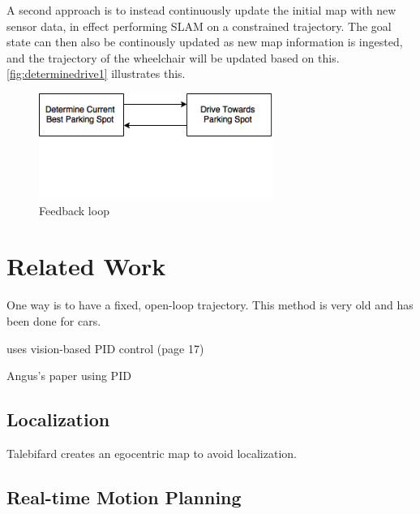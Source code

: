 A second approach is to instead continuously update the initial map with new
sensor data, in effect performing SLAM on a constrained trajectory. The goal
state can then also be continously updated as new map information is ingested,
and the trajectory of the wheelchair will be updated based on this.
\autoref{fig:determinedrive1} illustrates this.
 
\begin{figure} %
\centering
\includegraphics[width=3in]{figures/determinedrive1.png}
\caption{Feedback loop}
\label{fig:determinedrive1}
\end{figure}   %

\section{Related Work}
\label{sec:backinginlitreview}
One way is to have a fixed, open-loop trajectory. This method is very old and
has been done for cars.

\cite{sermeno2006vision} uses vision-based PID control (page 17)

Angus's paper using PID

\subsection{Localization}
Talebifard \cite{talebifard2014risk} creates an egocentric map to avoid
localization.

\subsection{Real-time Motion Planning}


